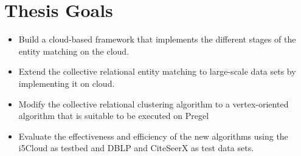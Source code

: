 \section{Thesis Goals}
\begin{itemize}
\item Build a cloud-based framework that implements the different stages of the entity matching on the cloud.
\item Extend the collective relational entity matching to large-scale data sets by implementing it on cloud.
\item Modify the collective relational clustering algorithm to a vertex-oriented algorithm that is suitable to be executed on Pregel
\item Evaluate the effectiveness and efficiency of the new algorithms using the i5Cloud as testbed and DBLP and CiteSeerX as test data sets.
\end{itemize}